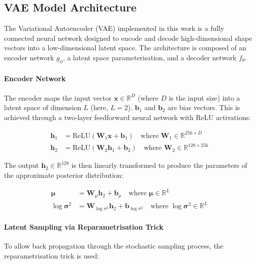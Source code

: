 \documentclass{article}
\begin{document}
\subsection{VAE Model Architecture}

The Variational Autoencoder (VAE) implemented in this work is a fully connected neural network designed to encode and decode high-dimensional shape vectors into a low-dimensional latent space. The architecture is composed of an encoder network $g_\phi$, a latent space parameterisation, and a decoder network $f_\theta$.

\paragraph{Encoder Network}

The encoder maps the input vector $\mathbf{x} \in \mathbb{R}^D$ (where $D$ is the input size) into a latent space of dimension $L$ (here, $L = 2$). $\textbf{b}_1$ and $\textbf{b}_2$ are bias vectors. This is achieved through a two-layer feedforward neural network with ReLU activations:

\begin{align}
\mathbf{h}_1 &= \text{ReLU}(\mathbf{W}_1 \mathbf{x} + \mathbf{b}_1) \quad \text{where } \mathbf{W}_1 \in \mathbb{R}^{256 \times D} \\
\mathbf{h}_2 &= \text{ReLU}(\mathbf{W}_2 \mathbf{h}_1 + \mathbf{b}_2) \quad \text{where } \mathbf{W}_2 \in \mathbb{R}^{128 \times 256}
\end{align}

The output $\mathbf{h}_2 \in \mathbb{R}^{128}$ is then linearly transformed to produce the parameters of the approximate posterior distribution:

\begin{align}
\boldsymbol{\mu} &= \mathbf{W}_\mu \mathbf{h}_2 + \mathbf{b}_\mu \quad \text{where } \boldsymbol{\mu} \in \mathbb{R}^L \\
\log \boldsymbol{\sigma}^2 &= \mathbf{W}_{\log\sigma^2} \mathbf{h}_2 + \mathbf{b}_{\log\sigma^2} \quad \text{where } \log \boldsymbol{\sigma}^2 \in \mathbb{R}^L
\end{align}

\paragraph{Latent Sampling via Reparametrisation Trick}

To allow back propagation through the stochastic sampling process, the reparametrisation trick is used:
\end{document}
